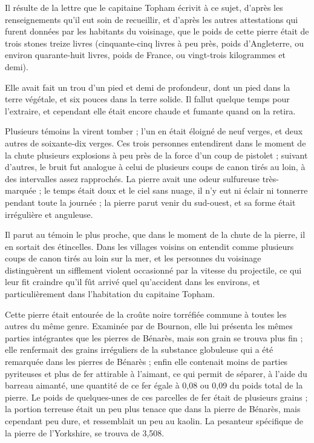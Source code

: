 \documentclass[a4paper, 12pt, oneside, french]{article}
\begin{document}
Il résulte de la lettre que le capitaine Topham écrivit à ce sujet, d'après les renseignements qu'il eut soin de recueillir, et d'après les autres attestations qui furent données par les habitants du voisinage, que le poids de cette pierre était de trois stones treize livres (cinquante-cinq livres à peu près, poids d'Angleterre, ou environ quarante-huit livres, poids de France, ou vingt-trois kilogrammes et demi).

Elle avait fait un trou d'un pied et demi de profondeur, dont un pied dans la terre végétale, et six pouces dans la terre solide. Il fallut quelque temps pour l'extraire, et cependant elle était encore chaude et fumante quand on la retira.

Plusieurs témoins la virent tomber ; l'un en était éloigné de neuf verges, et deux autres de soixante-dix verges. Ces trois personnes entendirent dans le moment de la chute plusieurs explosions à peu près de la force d'un coup de pistolet ; suivant d'autres, le bruit fut analogue à celui de plusieurs coups de canon tirés au loin, à des intervalles assez rapprochés. La pierre avait une odeur sulfureuse très-marquée ; le temps était doux et le ciel sans nuage, il n'y eut ni éclair ni tonnerre pendant toute la journée ; la pierre parut venir du sud-ouest, et sa forme était irrégulière et anguleuse.

Il parut au témoin le plus proche, que dans le moment de la chute de la pierre, il en sortait des étincelles. Dans les villages voisins on entendit comme plusieurs coups de canon tirés au loin sur la mer, et les personnes du voisinage distinguèrent un sifflement violent occasionné par la vitesse du projectile, ce qui leur fit craindre qu'il fût arrivé quel qu’accident dans les environs, et particulièrement dans l'habitation du capitaine Topham.

Cette pierre était entourée de la croûte noire torréfiée commune à toutes les autres du même genre. Examinée par de Bournon, elle lui présenta les mêmes parties intégrantes que les pierres de Bénarès, mais son grain se trouva plus fin ; elle renfermait des grains irréguliers de la substance globuleuse qui a été remarquée dans les pierres de Bénarès ; enfin elle contenait moins de parties pyriteuses et plus de fer attirable à l'aimant, ce qui permit de séparer, à l'aide du barreau aimanté, une quantité de ce fer égale à 0,08 ou 0,09 du poids total de la pierre. Le poids de quelques-unes de ces parcelles de fer était de plusieurs grains ; la portion terreuse était un peu plus tenace que dans la pierre de Bénarès, mais cependant peu dure, et ressemblait un peu au kaolin. La pesanteur spécifique de la pierre de l'Yorkshire, se trouva de 3,508.
\end{document}
